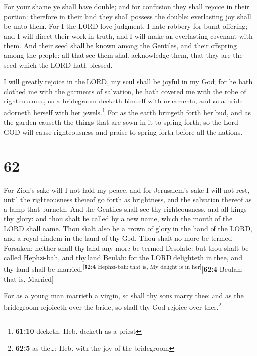  For your shame ye shall have double; and for confusion
they shall rejoice in their portion: therefore in their land they shall
possess the double: everlasting joy shall be unto them. 
For I the LORD love judgment, I hate robbery for burnt offering; and I
will direct their work in truth, and I will make an everlasting covenant
with them.  And their seed shall be known among the
Gentiles, and their offspring among the people: all that see them shall
acknowledge them, that they are the seed which the LORD hath blessed.

 I will greatly rejoice in the LORD, my soul shall be
joyful in my God; for he hath clothed me with the garments of salvation,
he hath covered me with the robe of righteousness, as a bridegroom
decketh himself with ornaments, and as a bride adorneth herself with her
jewels.\footnote{\textbf{61:10} decketh: Heb. decketh as a priest}
 For as the earth bringeth forth her bud, and as the
garden causeth the things that are sown in it to spring forth; so the
Lord GOD will cause righteousness and praise to spring forth before all
the nations.

\hypertarget{section-61}{%
\section{62}\label{section-61}}

 For Zion's sake will I not hold my peace, and for
Jerusalem's sake I will not rest, until the righteousness thereof go
forth as brightness, and the salvation thereof as a lamp that burneth.
 And the Gentiles shall see thy righteousness, and all
kings thy glory: and thou shalt be called by a new name, which the mouth
of the LORD shall name.  Thou shalt also be a crown of
glory in the hand of the LORD, and a royal diadem in the hand of thy
God.  Thou shalt no more be termed Forsaken; neither shall
thy land any more be termed Desolate: but thou shalt be called
Hephzi-bah, and thy land Beulah: for the LORD delighteth in thee, and
thy land shall be married.\textsuperscript{{[}\textbf{62:4} Hephzi-bah:
that is, My delight is in her{]}}{[}\textbf{62:4} Beulah: that is,
Married{]}

 For as a young man marrieth a virgin, so shall thy sons
marry thee: and as the bridegroom rejoiceth over the bride, so shall thy
God rejoice over thee.\footnote{\textbf{62:5} as the\ldots: Heb. with
  the joy of the bridegroom}

